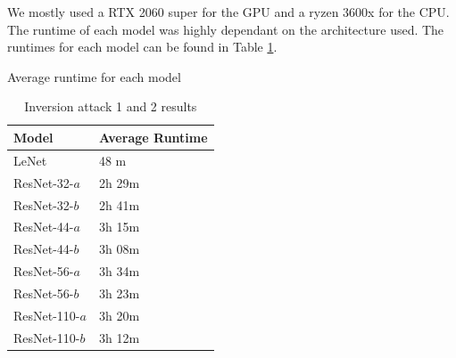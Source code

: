 We mostly used a RTX 2060 super for the GPU and a ryzen 3600x for the CPU. The runtime of each model was highly dependant on the architecture used. The runtimes for each model can be found in Table \ref{runtime-table}.

\begin{table}[!htb]
    \begin{minipage}{.45\linewidth}
    \setlength{\abovecaptionskip}{5pt}
    \caption{Average runtime for each model}
    \centering
  
    \begin{tabular}{l||l}
    \hline
    \textbf{Model} & \textbf{Average Runtime} \\
    \hline
    LeNet & 48 m \\
    ResNet-32-$a$ & 2h 29m \\
    ResNet-32-$b$ & 2h 41m \\
    ResNet-44-$a$ & 3h 15m \\
    ResNet-44-$b$ & 3h 08m \\
    ResNet-56-$a$ & 3h 34m \\
    ResNet-56-$b$ & 3h 23m \\
    ResNet-110-$a$ & 3h 20m \\
    ResNet-110-$b$ & 3h 12m \\
    \end{tabular}
    
    \label{runtime-table}
        
    \end{minipage}%
    \begin{minipage}{.45\linewidth}
    
    \centering
    \setlength{\abovecaptionskip}{5pt}
    \caption{Inversion attack 1 and 2 results}
\end{minipage}
\end{table}
